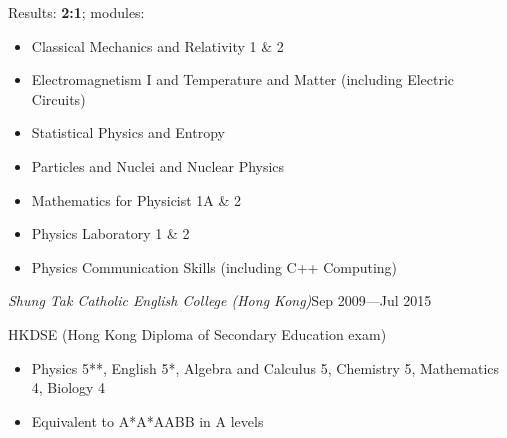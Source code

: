 \documentclass[a4paper, 12pt]{article}
\newcommand{\expentry}[3]{\emph{#1}\hfill{#2}---{#3}}
\begin{document}
    Results: \textbf{2:1}; modules:
    \begin{itemize}
    \setlength\itemsep{0em}
    \item Classical Mechanics and Relativity 1 \& 2
    \item Electromagnetism I and Temperature and Matter (including Electric Circuits)
    \item Statistical Physics and Entropy
    \item Particles and Nuclei and Nuclear Physics
    \item Mathematics for Physicist 1A \& 2
    \item Physics Laboratory 1 \& 2
    \item Physics Communication Skills (including C++ Computing)
    \end{itemize}
\expentry{Shung Tak Catholic English College (Hong Kong)}{Sep 2009}{Jul 2015}
    
    HKDSE (Hong Kong Diploma of Secondary Education exam)
    \begin{itemize}
    \setlength\itemsep{0em}
    \item Physics 5**, English 5*, Algebra and Calculus 5, Chemistry 5, Mathematics 4, Biology 4
    \item Equivalent to A*A*AABB in A levels
    \end{itemize}
\end{document}

